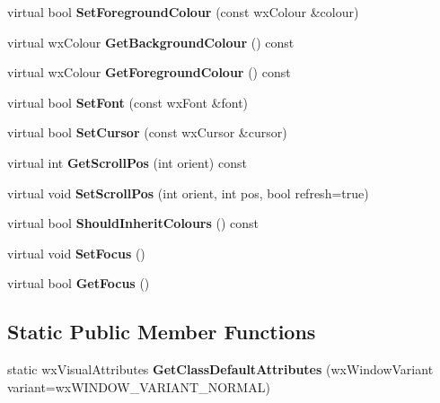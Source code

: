\begin{DoxyCompactItemize}
\item 
virtual bool {\bfseries SetForegroundColour} (const wxColour \&colour)\label{classMuleExtern_1_1wxGenericListCtrl_aba4e6eb50b50bfd9b77a37b038991e54}

\item 
virtual wxColour {\bfseries GetBackgroundColour} () const \label{classMuleExtern_1_1wxGenericListCtrl_ad7364e5859bbedb07f03e6c334f95d4c}

\item 
virtual wxColour {\bfseries GetForegroundColour} () const \label{classMuleExtern_1_1wxGenericListCtrl_aba2b5230691dc837570413937f33ac83}

\item 
virtual bool {\bfseries SetFont} (const wxFont \&font)\label{classMuleExtern_1_1wxGenericListCtrl_a966482a6daaec55269810a04e7592205}

\item 
virtual bool {\bfseries SetCursor} (const wxCursor \&cursor)\label{classMuleExtern_1_1wxGenericListCtrl_aedbb35d5d7203c48cfdd7ba4690872e6}

\item 
virtual int {\bfseries GetScrollPos} (int orient) const \label{classMuleExtern_1_1wxGenericListCtrl_a56d4cd46258613909e53c2712c3ae9f1}

\item 
virtual void {\bfseries SetScrollPos} (int orient, int pos, bool refresh=true)\label{classMuleExtern_1_1wxGenericListCtrl_a181f2712a7bfb536a46acd565231534a}

\item 
virtual bool {\bfseries ShouldInheritColours} () const \label{classMuleExtern_1_1wxGenericListCtrl_af2e4537560039aabc5cd5cf46235375d}

\item 
virtual void {\bfseries SetFocus} ()\label{classMuleExtern_1_1wxGenericListCtrl_a57dcc702cdffd9652adc9b06b55614ad}

\item 
virtual bool {\bfseries GetFocus} ()\label{classMuleExtern_1_1wxGenericListCtrl_ab869fb7b567ef2c0c7119316d4548e36}

\end{DoxyCompactItemize}
\subsection*{Static Public Member Functions}
\begin{DoxyCompactItemize}
\item 
static wxVisualAttributes {\bfseries GetClassDefaultAttributes} (wxWindowVariant variant=wxWINDOW\_\-VARIANT\_\-NORMAL)\label{classMuleExtern_1_1wxGenericListCtrl_ab81a6f3484d0b244b7d17e326b931fff}

\end{DoxyCompactItemize}
